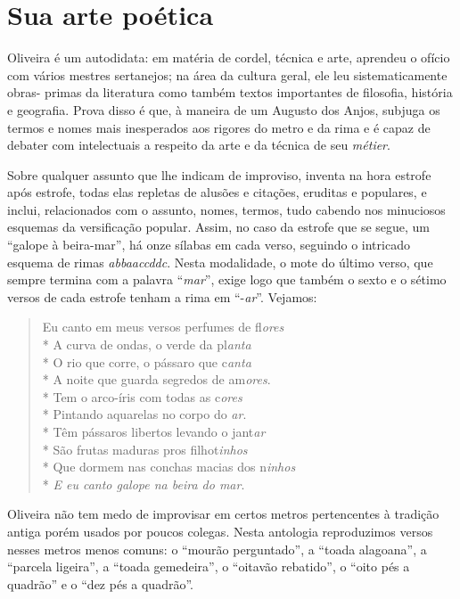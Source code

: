 \section{Sua arte poética}

Oliveira é um autodidata: em matéria de cordel, técnica
e arte, aprendeu o ofício com vários mestres sertanejos; na
área da cultura geral, ele leu sistematicamente obras-
primas da literatura como também textos importantes de
filosofia, história e geografia. Prova disso é que, à maneira
de um Augusto dos Anjos, subjuga os termos e nomes mais
inesperados aos rigores do metro e da rima e é capaz de
debater com intelectuais a respeito da arte e da técnica de
seu \textit{métier}.

Sobre qualquer assunto que lhe indicam de improviso,
inventa na hora estrofe após estrofe, todas elas repletas de
alusões e citações, eruditas e populares, e inclui,
relacionados com o assunto, nomes, termos, tudo cabendo
nos minuciosos esquemas da versificação popular. Assim,
no caso da estrofe que se segue, um ``galope à
beira-mar'',
há onze sílabas em cada verso, seguindo o intricado
esquema de rimas \textit{abbaaccddc}. Nesta modalidade, o mote
do último verso, que sempre termina com a palavra
``\textit{mar}'',
exige logo que também o sexto e o sétimo versos de cada
estrofe tenham a rima em ``-\textit{ar}''. Vejamos:

\begin{verse}

Eu canto em meus versos perfumes de fl\textit{ores}\\*
A curva de ondas, o verde da pl\textit{anta}\\*
O rio que corre, o pássaro que c\textit{anta}\\*
A noite que guarda segredos de am\textit{ores}.\\*
Tem o arco-íris com todas as c\textit{ores}\\*
Pintando aquarelas no corpo do \textit{ar}.\\*
Têm pássaros libertos levando o jant\textit{ar}\\*
São frutas maduras pros filhot\textit{inhos}\\*
Que dormem nas conchas macias dos n\textit{inhos}\\*
\textit{E eu canto galope na beira do mar}.

\end{verse}

Oliveira não tem medo de improvisar em certos metros
pertencentes à tradição antiga porém usados por poucos
colegas. Nesta antologia reproduzimos versos nesses metros
menos comuns: o ``mourão perguntado'', a
``toada alagoana'', a ``parcela ligeira'', a ``toada gemedeira'', o
``oitavão rebatido'', o ``oito pés a quadrão'' e o ``dez pés a
quadrão''.

